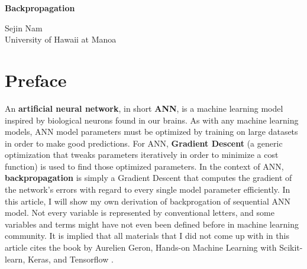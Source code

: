 \documentclass[letterpaper, 11pt]{article}
\numberwithin{equation}{section}
\numberwithin{figure}{section}
\numberwithin{table}{section}
\begin{document}
\begin{titlepage}
	\begin{center}
		\Huge{\bfseries Backpropagation}\vfill 
	\end{center}

	\begin{flushright}
		Sejin Nam\\
		University of Hawaii at Manoa
	\end{flushright}
\end{titlepage}

\section*{\centering Preface}
An \textbf{artificial neural network}, in short \textbf{ANN}, is a machine learning model inspired by biological neurons found in our brains. As with any machine learning models, ANN model parameters must be optimized by training on large datasets in order to make good predictions. For ANN, \textbf{Gradient Descent} (a generic optimization that tweaks parameters iteratively in order to minimize a cost function) is used to find those optimized parameters. In the context of ANN, \textbf{backpropagation} is simply a Gradient Descent that computes the gradient of the network's errors with regard to every single model parameter efficiently. In this article, I will show my own derivation of backprogation of sequential ANN model. Not every variable is represented by conventional letters, and some variables and terms might have not even been defined before in machine learning community. It is implied that all materials that I did not come up with in this article cites the book by Aurelien Geron, Hands-on Machine Learning with Scikit-learn, Keras, and Tensorflow \cite{Geron}.
\cleardoublepage
\end{document}
